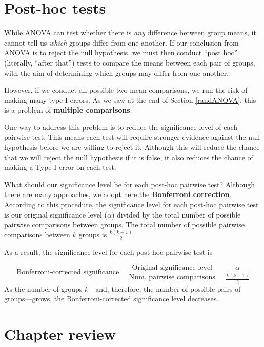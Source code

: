 \documentclass[
  10pt,
  openany]{book}
\begin{document}
\hypertarget{anova-post-hoc}{%
\section{Post-hoc tests}\label{anova-post-hoc}}

While ANOVA can test whether there is \emph{any} difference between group means, it cannot tell us \emph{which} groups differ from one another.
If our conclusion from ANOVA is to reject the null hypothesis, we must then conduct ``post hoc'' (literally, ``after that'') tests to compare the means between each pair of groups, with the aim of determining which groups may differ from one another.

However, if we conduct all possible two mean comparisons, we run the risk of making many type I errors.
As we saw at the end of Section \ref{randANOVA}, this is a problem of \textbf{multiple comparisons}.

One way to address this problem is to reduce the significance level of each pairwise test. This means each test will require stronger evidence against the null hypothesis before we are willing to reject it. Although this will reduce the chance that we will reject the null hypothesis if it is false, it also reduces the chance of making a Type I error on each test.

What should our significance level be for each post-hoc pairwise test? Although there are many approaches, we adopt here the \textbf{Bonferroni correction}. According to this procedure, the significance level for each post-hoc pairwise test is our original significance level (\(\alpha\)) divided by the total number of possible pairwise comparisons between groups. The total number of possible pairwise comparisons between \(k\) groups is \(\frac{k (k - 1)}{2}\).

As a result, the significance level for each post-hoc pairwise test is

\[
\text{Bonferroni-corrected significance} = \frac{\text{Original significance level}}{\text{Num. pairwise comparisons}} = \frac{\alpha}{\frac{k (k - 1)}{2}}
\]
As the number of groups \(k\)---and, therefore, the number of possible pairs of groups---grows, the Bonferroni-corrected significance level decreases.

\clearpage

\hypertarget{chp22-review}{%
\section{Chapter review}\label{chp22-review}}
\end{document}
